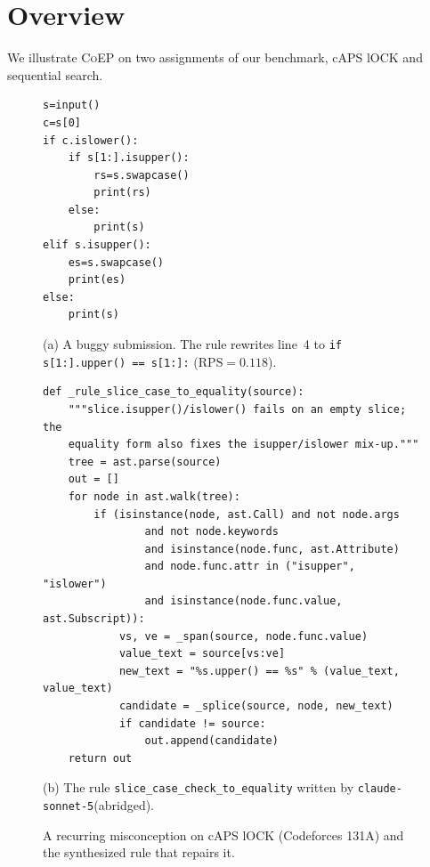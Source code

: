 \documentclass[acmsmall,screen,review,anonymous,nonacm]{acmart}
\newcommand{\tool}{\textsc{CoEP}\xspace}
\newcommand{\RPS}{\mathrm{RPS}}
\newcommand{\cs}{\texttt{claude-sonnet-5}\xspace}
\begin{document}
\section{Overview}
\label{sec:overview}

We illustrate \tool on two assignments of our benchmark, cAPS lOCK and sequential search.

\begin{figure}[t]
\centering
\begin{minipage}[t]{0.30\textwidth}
\begin{lstlisting}
s=input()
c=s[0]
if c.islower():
    if s[1:].isupper():
        rs=s.swapcase()
        print(rs)
    else:
        print(s)
elif s.isupper():
    es=s.swapcase()
    print(es)
else:
    print(s)
\end{lstlisting}
\centering\footnotesize (a) A buggy submission. The rule rewrites line~4 to \texttt{if s[1:].upper() == s[1:]:} ($\RPS = 0.118$).
\end{minipage}\hfill
\begin{minipage}[t]{0.67\textwidth}
\begin{lstlisting}
def _rule_slice_case_to_equality(source):
    """slice.isupper()/islower() fails on an empty slice; the
    equality form also fixes the isupper/islower mix-up."""
    tree = ast.parse(source)
    out = []
    for node in ast.walk(tree):
        if (isinstance(node, ast.Call) and not node.args
                and not node.keywords
                and isinstance(node.func, ast.Attribute)
                and node.func.attr in ("isupper", "islower")
                and isinstance(node.func.value, ast.Subscript)):
            vs, ve = _span(source, node.func.value)
            value_text = source[vs:ve]
            new_text = "%s.upper() == %s" % (value_text, value_text)
            candidate = _splice(source, node, new_text)
            if candidate != source:
                out.append(candidate)
    return out
\end{lstlisting}
\centering\footnotesize (b) The rule \texttt{slice\_case\_check\_to\_equality} written by \cs (abridged).
\end{minipage}
\caption{A recurring misconception on cAPS lOCK (Codeforces 131A) and the synthesized rule that repairs it.}
\label{fig:example}
\end{figure}
\end{document}
